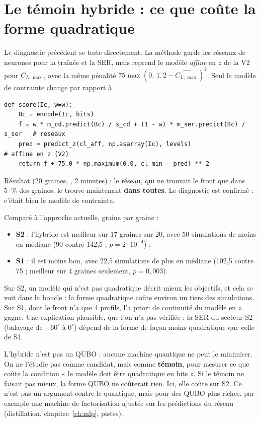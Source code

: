 \section{Le témoin hybride : ce que coûte la forme quadratique}
Le diagnostic précédent se teste directement. La méthode  garde les réseaux de neurones pour la traînée et la SER, mais reprend le modèle \emph{affine} en $z$ de la V2 pour $C_{L,\max}$, avec la même pénalité $75\max(0,\,1{,}2-\widehat{C_{L,\max}})^2$. Seul le modèle de contrainte change par rapport à .
\begin{codebox}
\begin{lstlisting}
def score(Ic, w=w):
    Bc = encode(Ic, bits)
    f = w * m_cd.predict(Bc) / s_cd + (1 - w) * m_ser.predict(Bc) / s_ser   # reseaux
    pred = predict_z(cl_aff, np.asarray(Ic), levels)                         # affine en z (V2)
    return f + 75.0 * np.maximum(0.0, cl_min - pred) ** 2
\end{lstlisting}
\end{codebox}
Résultat (20 graines, , 2 minutes) : le réseau, qui ne trouvait le front que dans 5~\% des graines, le trouve maintenant \textbf{dans toutes}. Le diagnostic est confirmé : c'était bien le modèle de contrainte.

Comparé à l'approche actuelle, graine par graine :
\begin{itemize}
\item \textbf{S2} : l'hybride est meilleur sur 17 graines sur 20, avec 50 simulations de moins en médiane (90 contre 142,5 ; $p=2\cdot10^{-4}$) ;
\item \textbf{S1} : il est moins bon, avec 22,5 simulations de plus en médiane (102,5 contre 75 ; meilleur sur 4 graines seulement, $p=0{,}003$).
\end{itemize}
Sur S2, un modèle qui n'est pas quadratique décrit mieux les objectifs, et cela se voit dans la boucle : la forme quadratique coûte environ un tiers des simulations. Sur S1, dont le front n'a que 4 profils, l'a priori de continuité du modèle en $z$ gagne. Une explication plausible, que l'on n'a pas vérifiée : la SER du secteur S2 (balayage de $-60^\circ$ à $0^\circ$) dépend de la forme de façon moins quadratique que celle de S1.

\begin{piege}
L'hybride n'est pas un QUBO : aucune machine quantique ne peut le minimiser. On ne l'étudie pas comme candidat, mais comme \textbf{témoin}, pour mesurer ce que coûte la condition « le modèle doit être quadratique en bits ». Si le témoin ne faisait pas mieux, la forme QUBO ne coûterait rien. Ici, elle coûte sur S2. Ce n'est pas un argument contre le quantique, mais pour des QUBO plus riches, par exemple une machine de factorisation ajustée sur les prédictions du réseau (distillation, chapitre~\ref{ch:mlp}, pistes).
\end{piege}

